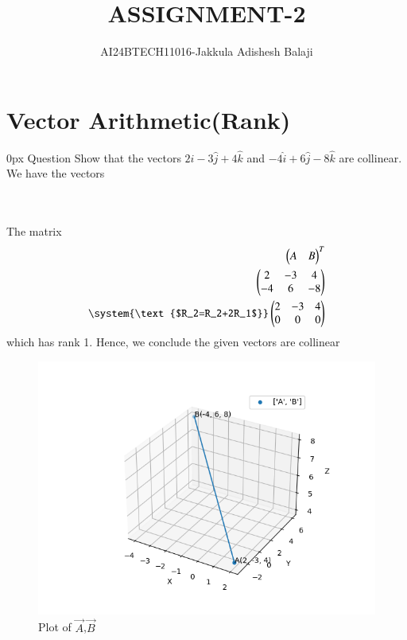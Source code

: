 \documentclass[journal]{IEEEtran}
\begin{document}

\renewcommand{\thefigure}{\theenumi}
\renewcommand{\thetable}{\theenumi}
\setlength{\intextsep}{10pt} %
\renewcommand{\thetable}{\theenumi}
\title{ASSIGNMENT-2}
\author{AI24BTECH11016-Jakkula Adishesh Balaji}
\maketitle
\bigskip
\section*{\textbf{Vector Arithmetic(Rank)}}
         \parindent 0px
         Question Show that the vectors $2\hat{i}-3\hat{j}+4\hat{k}$ and $-4\hat{i}+6\hat{j}-8\hat{k}$ are collinear.\\
         \solution We have the vectors \\ \\
         \begin{table}[h!]
         \centering
         
         \label{tab1.6.2.2}
         \end{table}
\\  
         The matrix 
         \centering
         \begin{align*}
         {\myvec{A&B}}^{T} \\
         \myvec{2&-3&4\\-4&6&-8} \\
         \system{\text{$R_2=R_2+2R_1$}}
         \myvec{2&-3&4\\0&0&0}\\
         \end{align*}
         which has rank 1. Hence, we conclude the given vectors are collinear
         \begin{figure}[h]
           \centering
           \includegraphics[width=\columnwidth]{figs/fig.png}
           \caption{Plot of $\vec{A}$,$\vec{B}$}
 \end{figure}
\end{document}
